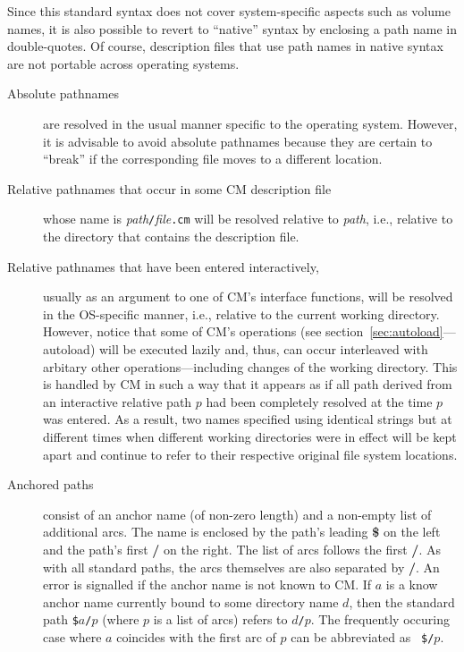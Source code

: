 \documentclass[titlepage,letterpaper]{article}
\begin{document}
Since this standard syntax does not cover system-specific aspects such
as volume names, it is also possible to revert to ``native'' syntax by
enclosing a path name in double-quotes.  Of course, description files
that use path names in native syntax are not portable across operating
systems.

\begin{description}
\item[Absolute pathnames] are resolved in the usual manner
specific to the operating system.  However, it is advisable to avoid
absolute pathnames because they are certain to ``break'' if the
corresponding file moves to a different location.
\item[Relative pathnames that occur in some CM description file] whose
name is {\it path}{\tt /}{\it file}{\tt .cm} will be resolved relative
to {\it path}, i.e., relative to the directory that contains the
description file.
\item[Relative pathnames that have been entered interactively,]
usually as an argument to one of CM's interface functions, will be
resolved in the OS-specific manner, i.e., relative to the current
working directory.  However, notice that some of CM's operations (see
section~\ref{sec:autoload}---autoload) will be executed lazily and,
thus, can occur interleaved with arbitary other operations---including
changes of the working directory.  This is handled by CM in such a way
that it appears as if all path derived from an interactive relative
path $p$ had been completely resolved at the time $p$ was entered. As
a result, two names specified using identical strings but at different
times when different working directories were in effect will be kept
apart and continue to refer to their respective original file system
locations.
\item[Anchored paths] consist of an anchor name (of non-zero length)
and a non-empty list of additional arcs.  The name is enclosed by
the path's leading {\bf \$} on the left and the path's first {\bf /}
on the right.  The list of arcs follows the first {\bf /}.  As with
all standard paths, the arcs themselves are also separated by {\bf /}.
An error is signalled if the anchor name is not known to CM.
If $a$ is a know anchor name currently bound to some directory name
$d$, then the standard path {\tt \$}$a${\tt /}$p$ (where $p$ is a list
of arcs) refers to $d${\tt /}$p$.  The frequently occuring case where
$a$ coincides with the first arc of $p$ can be abbreviated as {\tt
\$/}$p$.
\end{description}
\end{document}
